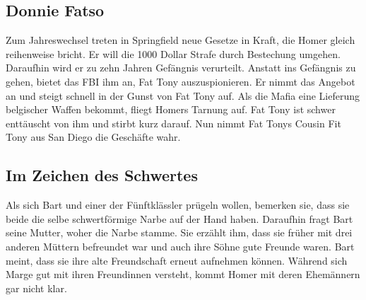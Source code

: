 
\subsection{Donnie Fatso}
Zum Jahreswechsel treten in Springfield neue Gesetze in Kraft, die Homer gleich reihenweise bricht. Er will die 1000 Dollar Strafe durch Bestechung umgehen. Daraufhin wird er zu zehn Jahren Gefängnis verurteilt. Anstatt ins Gefängnis zu gehen, bietet das FBI ihm an, Fat Tony auszuspionieren. Er nimmt das Angebot an und steigt schnell in der Gunst von Fat Tony auf. Als die Mafia eine Lieferung belgischer Waffen bekommt, fliegt Homers Tarnung auf. Fat Tony ist schwer enttäuscht von ihm und stirbt kurz darauf. Nun nimmt Fat Tonys Cousin Fit Tony aus San Diego die Geschäfte wahr.


\subsection{Im Zeichen des Schwertes}\label{NABF03}
Als sich Bart und einer der Fünftklässler prügeln wollen, bemerken sie, dass sie beide die selbe schwertförmige Narbe auf der Hand haben. Daraufhin fragt Bart seine Mutter, woher die Narbe stamme. Sie erzählt ihm, dass sie früher mit drei anderen Müttern befreundet war und auch ihre Söhne gute Freunde waren. Bart meint, dass sie ihre alte Freundschaft erneut aufnehmen können. Während sich Marge gut mit ihren Freundinnen versteht, kommt Homer mit deren Ehemännern gar nicht klar.


